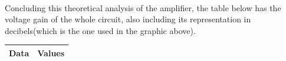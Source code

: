 \paragraph{}Concluding this theoretical analysis of the amplifier, the table below has the voltage gain of the whole circuit, also including its representation in decibels(which is the one used in the graphic above). 

\begin{table}[H]
	\centering
	\begin{tabular}{|l|l|} 
		\hline
		Data             & Values                               \\ 
		\hline
		
	\end{tabular}
\end{table}


